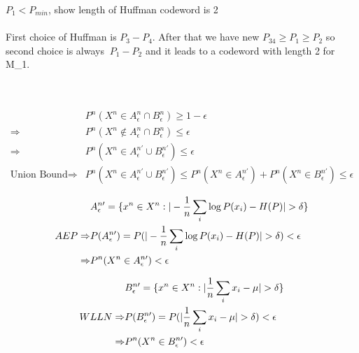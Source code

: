 \documentclass[
  course = {{EE623 Information Theory}},
  quartile = {{3}},
  assignment = 3,
  name = {{Mohammad Mahdi Rahimi}},
  studentnumber = {{20208244}},
  email = {{mahi@kaist.ac.kr}},
  firstexercise = 1
]{aga-homework}
\begin{document}
\subexercise $P_{1} < P_{min}$, show length of Huffman codeword is 2 
\\\\
First choice of Huffman is $P_3 - P_4$. After that we have new $P_{34} \ge P_1 \ge P_2$ so second choice is always $\ P_1 - P_2$ and it leads to a codeword with length 2 for M_1.

\exercise
\subexercise
\\\\

\begin{equation}
    \begin{split}
        & P^n(X^n \in A^n_\epsilon \cap B^n_\epsilon) \ge 1 - \epsilon\\
        \Rightarrow & P^n(X^n \notin A^n_\epsilon \cap B^n_\epsilon) \le \epsilon\\
        \Rightarrow & P^n(X^n \in A^{n\prime}_\epsilon \cup B^{n\prime}_\epsilon) \le \epsilon\\
        \text{Union Bound} \Rightarrow & P^n(X^n \in A^{n\prime}_\epsilon \cup B^{n\prime}_\epsilon) \le P^n(X^n \in A^{n\prime}_\epsilon) + P^n(X^n \in  B^{n\prime}_\epsilon) \le \epsilon
    \end{split}
\end{equation}

\begin{equation}
    \begin{split}
        & A^{n\prime}_\epsilon = \{x^n \in X^n : |-{1 \over n}\sum_i{\log{P(x_i)}} - H(P)| > \delta\} \\
        AEP \Rightarrow & P(A^{n\prime}_\epsilon) = P(|-{1 \over n}\sum_i{\log{P(x_i)}} - H(P)| > \delta) < \epsilon\\
        \Rightarrow & P^n(X^n \in A^{n\prime}_\epsilon) < \epsilon
    \end{split}
\end{equation}

\begin{equation}
    \begin{split}
        & B^{n\prime}_\epsilon = \{x^n \in X^n : |{1 \over n}\sum_i{x_i} - \mu| > \delta\} \\
        WLLN \Rightarrow & P(B^{n\prime}_\epsilon) = P(|{1 \over n}\sum_i{x_i} - \mu| > \delta) < \epsilon\\
        \Rightarrow & P^n(X^n \in B^{n\prime}_\epsilon) < \epsilon
    \end{split}
\end{equation}
\end{document}

